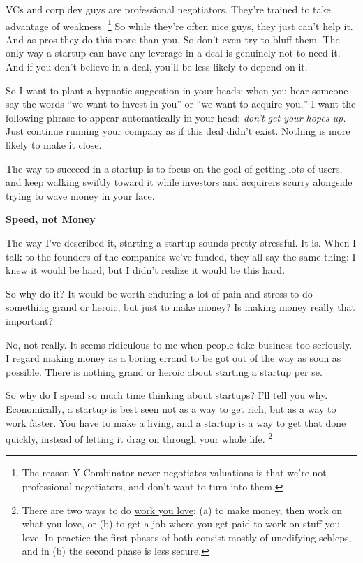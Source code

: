 \documentclass[12pt]{book}
\begin{document}
VCs and corp dev guys are professional negotiators. They're trained to
take advantage of weakness. \footnote{The reason Y Combinator never negotiates valuations is that
we're not professional negotiators, and don't want to turn into them.} So while they're
often nice guys, they just can't help it. And as pros they do this more
than you. So don't even try to bluff them. The only way a startup can
have any leverage in a deal is genuinely not to need it. And if you
don't believe in a deal, you'll be less likely to depend on it.

So I want to plant a hypnotic suggestion in your heads: when you hear
someone say the words ``we want to invest in you'' or ``we want to
acquire you,'' I want the following phrase to appear automatically in
your head: \emph{don't get your hopes up.} Just continue running your
company as if this deal didn't exist. Nothing is more likely to make it
close.

The way to succeed in a startup is to focus on the goal of getting lots
of users, and keep walking swiftly toward it while investors and
acquirers scurry alongside trying to wave money in your face.

\textbf{Speed, not Money}

The way I've described it, starting a startup sounds pretty stressful.
It is. When I talk to the founders of the companies we've funded, they
all say the same thing: I knew it would be hard, but I didn't realize it
would be this hard.

So why do it? It would be worth enduring a lot of pain and stress to do
something grand or heroic, but just to make money? Is making money
really that important?

No, not really. It seems ridiculous to me when people take business too
seriously. I regard making money as a boring errand to be got out of the
way as soon as possible. There is nothing grand or heroic about starting
a startup per se.

So why do I spend so much time thinking about startups? I'll tell you
why. Economically, a startup is best seen not as a way to get rich, but
as a way to work faster. You have to make a living, and a startup is a
way to get that done quickly, instead of letting it drag on through your
whole life. \footnote{There are two ways to do \href{love.html}{work you love}: (a) to
make money, then work on what you love, or (b) to get a job where you
get paid to work on stuff you love. In practice the first phases of both
consist mostly of unedifying schleps, and in (b) the second phase is
less secure.}
\end{document}
